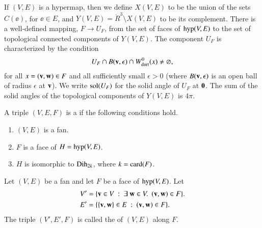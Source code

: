 \documentclass{llncs}
\def\op#1{{\hbox{#1}}}
\begin{document}
If $(V,E)$ is a hypermap, then we
define $X(V,E)$ to be the union of the sets $C(\ee)$, for $\ee\in E$,
and $Y(V,E) = \ring{R}^3 \setminus X(V,E)$ to be its complement.  There is
a well-defined mapping, $F\to U_F$, from the set of faces of $\op{hyp}(V,E)$ to the set of 
topological
connected components of $Y(V,E)$.  The component $U_F$ is characterized by the condition
\[
U_F \cap B({\mathbf v},\epsilon) \cap W^0_{\text{dart}}(x)\ne\varnothing,
\]
for all $x=({\mathbf v},{\mathbf w})\in F$ and all sufficiently small $\epsilon>0$ (where $B({\mathbf v},\epsilon)$ is
an open ball of radius $\epsilon$ at ${\mathbf v}$).
 We write $\op{sol}(U_F)$ for the solid
angle of $U_F$ at ${\mathbf 0}$.  The sum of the solid angles of the topological components
of $Y(V,E)$ is $4\pi$.

\begin{definition} \label{def:convex-local}
A triple $(V,E,F)$ is a  if the following conditions hold.
\begin{enumerate} 
\item {} $(V,E)$ is a fan.
\item {} $F$ is a face of $H = \op{hyp}(V,E)$.
\item {} $H$ is isomorphic to $\op{Dih}_{2k}$, where $k =
\card(F)$.
\end{enumerate}
\end{definition}
%

\begin{definition}[localization]
\hspace{-3pt}
 Let $(V,E)$ be a fan and let $F$ be
a face of $\op{hyp}(V,E)$.  Let
\begin{align*}
V' &= \{{\mathbf v}\in V \ :\  \exists~{\mathbf w}\in V.~~({\mathbf v},{\mathbf w})\in F\}.\\
E' &= \{\{{\mathbf v},{\mathbf w}\} \in E\ :\  ({\mathbf v},{\mathbf w})\in F\}.
\end{align*}
The triple $(V',E',F)$ is called the  of $(V,E)$ along $F$.
\end{definition}
%
\end{document}
